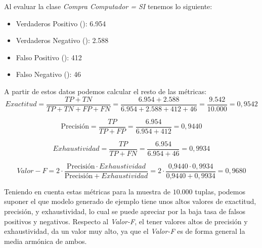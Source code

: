 Al evaluar la clase \textit{Compra Computador = SI} tenemos lo siguiente:

\begin{itemize}
	\item Verdaderos Positivo (): 6.954
	\item Verdaderos Negativo (): 2.588
	\item Falso Positivo (): 412
	\item Falso Negativo (): 46
\end{itemize}

A partir de estos datos podemos calcular el resto de las métricas:
\begin{equation*}
Exactitud = \frac{TP + TN}{TP + TN + FP + FN} = \frac{6.954 + 2.588}{6.954 + 2.588 + 412 + 46} = \frac{9.542}{10.000} = 0,9542
\end{equation*}

\begin{equation*}
\mbox{Precisión} = \frac{TP}{TP + FP} = \frac{6.954}{6.954 + 412} = 0,9440
\end{equation*}

\begin{equation*}
Exhaustividad = \frac{TP}{TP + FN} = \frac{6.954}{6.954 + 46} = 0,9934
\end{equation*}

\begin{equation*}
Valor-F = 2 \cdot \frac{\mbox{Precisión} \cdot Exhaustividad}{\mbox{Precisión} + Exhaustividad} 
		= 2 \cdot \frac{\mbox{0,9440} \cdot 0,9934}{\mbox{0,9440} + 0,9934}
		= 0,9680
\end{equation*}

Teniendo en cuenta estas métricas para la muestra de $10.000$ tuplas, podemos suponer el que modelo generado de ejemplo tiene unos altos valores de exactitud, precisión, y exhaustividad, lo cual se puede apreciar por la baja tasa de falsos positivos y negativos. Respecto al \emph{Valor-F}, el tener valores altos de precisión y exhaustividad, da un valor muy alto, ya que el \emph{Valor-F} es de forma general la media armónica de ambos.

